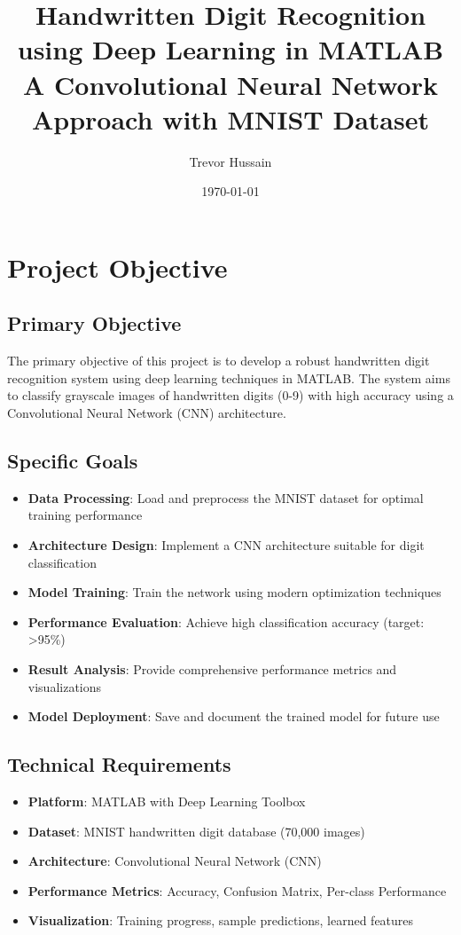 \documentclass[12pt,a4paper]{article}
\title{\textbf{Handwritten Digit Recognition using Deep Learning in MATLAB} \\ 
       \large A Convolutional Neural Network Approach with MNIST Dataset}
\author{Trevor Hussain}
\date{\today}
\begin{document}
\maketitle

\tableofcontents
\newpage

\section{Project Objective}

\subsection{Primary Objective}
The primary objective of this project is to develop a robust handwritten digit recognition system using deep learning techniques in MATLAB. The system aims to classify grayscale images of handwritten digits (0-9) with high accuracy using a Convolutional Neural Network (CNN) architecture.

\subsection{Specific Goals}
\begin{itemize}
    \item \textbf{Data Processing}: Load and preprocess the MNIST dataset for optimal training performance
    \item \textbf{Architecture Design}: Implement a CNN architecture suitable for digit classification
    \item \textbf{Model Training}: Train the network using modern optimization techniques
    \item \textbf{Performance Evaluation}: Achieve high classification accuracy (target: >95\%)
    \item \textbf{Result Analysis}: Provide comprehensive performance metrics and visualizations
    \item \textbf{Model Deployment}: Save and document the trained model for future use
\end{itemize}

\subsection{Technical Requirements}
\begin{itemize}
    \item \textbf{Platform}: MATLAB with Deep Learning Toolbox
    \item \textbf{Dataset}: MNIST handwritten digit database (70,000 images)
    \item \textbf{Architecture}: Convolutional Neural Network (CNN)
    \item \textbf{Performance Metrics}: Accuracy, Confusion Matrix, Per-class Performance
    \item \textbf{Visualization}: Training progress, sample predictions, learned features
\end{itemize}
\end{document}
